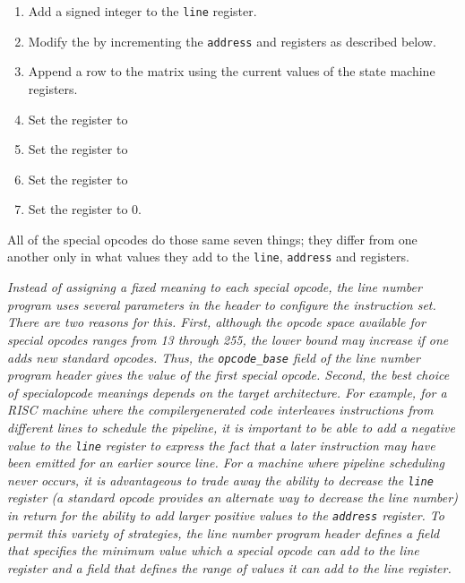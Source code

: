 \begin{enumerate}[1. ]

\item  Add a signed integer to the \texttt{line} register.

\item  Modify the  by incrementing the
\texttt{address} and  registers as described below.

\item  Append a row to the matrix using the current values
of the state machine registers.

\item  Set the  register to  
\item  Set the  register to 
\item  Set the  register to 
\item  Set the  register to 0.

\end{enumerate}

All of the special opcodes do those same seven things; they
differ from one another only in what values they add to the
\texttt{line}, \texttt{address} and  registers.


\textit{Instead of assigning a fixed meaning to each special opcode,
the line number program uses several parameters in the header
to configure the instruction set. There are two reasons
for this.  First, although the opcode space available for
special opcodes ranges from 13 through 255, the lower
bound may increase if one adds new standard opcodes. Thus, the
\texttt{opcode\_base} field of the line number program header gives the
value of the first special opcode. Second, the best choice of
special\dash opcode meanings depends on the target architecture. For
example, for a RISC machine where the compiler\dash generated code
interleaves instructions from different lines to schedule
the pipeline, it is important to be able to add a negative
value to the \texttt{line} register to express the fact that a later
instruction may have been emitted for an earlier source
line. For a machine where pipeline scheduling never occurs,
it is advantageous to trade away the ability to decrease
the \texttt{line} register (a standard opcode provides an alternate
way to decrease the line number) in return for the ability
to add larger positive values to the \texttt{address} register. To
permit this variety of strategies, the line number program
header defines a 
field that specifies the minimum
value which a special opcode can add to the line register
and a 
field that defines the range of values it
can add to the line register.}


